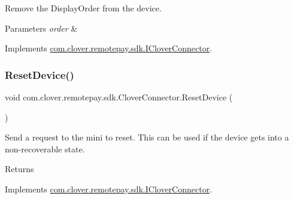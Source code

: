 Remove the Display\+Order from the device. 


\begin{DoxyParams}{Parameters}
{\em order} & \\
\hline
\end{DoxyParams}


Implements \hyperlink{interfacecom_1_1clover_1_1remotepay_1_1sdk_1_1_i_clover_connector_a55ebe329c852bedccaeb882ca71c4774}{com.\+clover.\+remotepay.\+sdk.\+I\+Clover\+Connector}.

\mbox{\label{classcom_1_1clover_1_1remotepay_1_1sdk_1_1_clover_connector_a422575429ff010ed302c57eb5542c35f}} 
\subsubsection{\texorpdfstring{Reset\+Device()}{ResetDevice()}}
{\footnotesize\ttfamily void com.\+clover.\+remotepay.\+sdk.\+Clover\+Connector.\+Reset\+Device (\begin{DoxyParamCaption}{ }\end{DoxyParamCaption})}



Send a request to the mini to reset. This can be used if the device gets into a non-\/recoverable state. 

\begin{DoxyReturn}{Returns}

\end{DoxyReturn}


Implements \hyperlink{interfacecom_1_1clover_1_1remotepay_1_1sdk_1_1_i_clover_connector_aafead472d6f0adc74084a229bf75e5ed}{com.\+clover.\+remotepay.\+sdk.\+I\+Clover\+Connector}.

\mbox{\label{classcom_1_1clover_1_1remotepay_1_1sdk_1_1_clover_connector_a7a5404c24cac6be283c80a7983bfa4eb}} 
